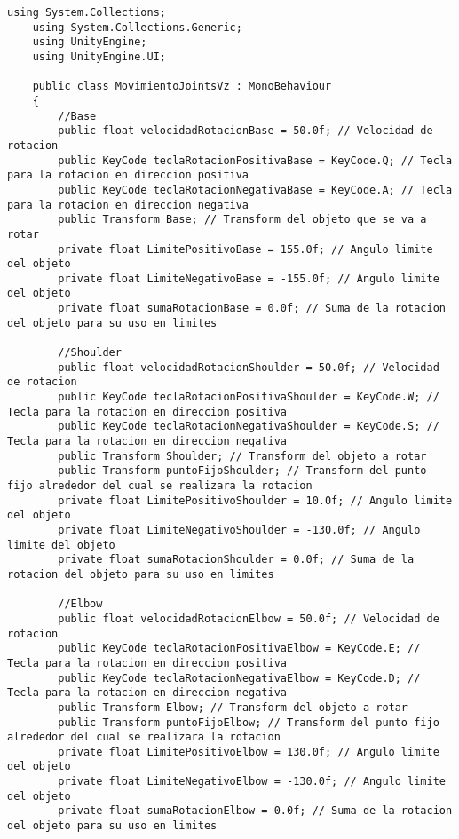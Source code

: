 \begin{lstlisting}[frame=single]
    using System.Collections;
    using System.Collections.Generic;
    using UnityEngine;
    using UnityEngine.UI;

    public class MovimientoJointsVz : MonoBehaviour
    {
        //Base
        public float velocidadRotacionBase = 50.0f; // Velocidad de rotacion
        public KeyCode teclaRotacionPositivaBase = KeyCode.Q; // Tecla para la rotacion en direccion positiva
        public KeyCode teclaRotacionNegativaBase = KeyCode.A; // Tecla para la rotacion en direccion negativa
        public Transform Base; // Transform del objeto que se va a rotar
        private float LimitePositivoBase = 155.0f; // Angulo limite del objeto
        private float LimiteNegativoBase = -155.0f; // Angulo limite del objeto
        private float sumaRotacionBase = 0.0f; // Suma de la rotacion del objeto para su uso en limites

        //Shoulder
        public float velocidadRotacionShoulder = 50.0f; // Velocidad de rotacion
        public KeyCode teclaRotacionPositivaShoulder = KeyCode.W; // Tecla para la rotacion en direccion positiva
        public KeyCode teclaRotacionNegativaShoulder = KeyCode.S; // Tecla para la rotacion en direccion negativa
        public Transform Shoulder; // Transform del objeto a rotar
        public Transform puntoFijoShoulder; // Transform del punto fijo alrededor del cual se realizara la rotacion
        private float LimitePositivoShoulder = 10.0f; // Angulo limite del objeto
        private float LimiteNegativoShoulder = -130.0f; // Angulo limite del objeto
        private float sumaRotacionShoulder = 0.0f; // Suma de la rotacion del objeto para su uso en limites

        //Elbow
        public float velocidadRotacionElbow = 50.0f; // Velocidad de rotacion
        public KeyCode teclaRotacionPositivaElbow = KeyCode.E; // Tecla para la rotacion en direccion positiva
        public KeyCode teclaRotacionNegativaElbow = KeyCode.D; // Tecla para la rotacion en direccion negativa
        public Transform Elbow; // Transform del objeto a rotar
        public Transform puntoFijoElbow; // Transform del punto fijo alrededor del cual se realizara la rotacion
        private float LimitePositivoElbow = 130.0f; // Angulo limite del objeto
        private float LimiteNegativoElbow = -130.0f; // Angulo limite del objeto
        private float sumaRotacionElbow = 0.0f; // Suma de la rotacion del objeto para su uso en limites


\end{lstlisting}
